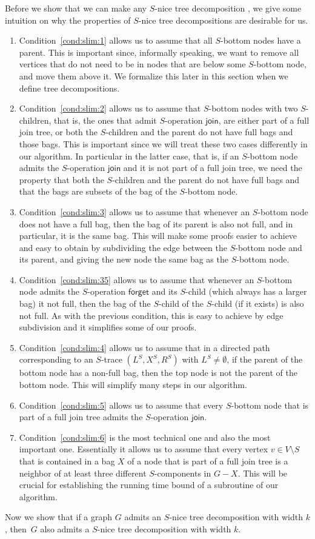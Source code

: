\documentclass[a4paper,UKenglish,cleveref, autoref, thm-restate, numberwithinsect]{lipics-v2021}
\newcounter{algorithm}
\newcommand{\forget}{\mathsf{forget}}
\newcommand{\join}{\mathsf{join}}
\newcommand{\slim}{\text{slim}\xspace}
\newcommand{\topheavy}{\text{top-heavy}\xspace}
\begin{document}
Before we show that we can make any $S$-nice tree decomposition \slim, we give some intuition on why the properties of \slim $S$-nice tree decompositions are desirable for us.
\begin{enumerate}
\item Condition~\ref{cond:slim:1} allows us to assume that all $S$-bottom nodes have a parent. This is important since, informally speaking, we want to remove all vertices that do not need to be in nodes that are below some $S$-bottom node, and move them above it. We formalize this later in this section when we define \topheavy tree decompositions.
\item Condition~\ref{cond:slim:2} allows us to assume that $S$-bottom nodes with two $S$-children, that is, the ones that admit $S$-operation $\join$, are either part of a full join tree, or both the $S$-children and the parent do not have full bags and those bags. This is important since we will treat these two cases differently in our algorithm. In particular in the latter case, that is, if an $S$-bottom node admits the $S$-operation $\join$ and it is not part of a full join tree, we need the property that both the $S$-children and the parent do not have full bags and that the bags are subsets of the bag of the $S$-bottom node.
\item Condition~\ref{cond:slim:3} allows us to assume that whenever an $S$-bottom node does not have a full bag, then the bag of its parent is also not full, and in particular, it is the same bag. This will make some proofs easier to achieve and easy to obtain by subdividing the edge between the $S$-bottom node and its parent, and giving the new node the same bag as the $S$-bottom node.
\item Condition~\ref{cond:slim:35} allows us to assume that whenever an $S$-bottom node admits the $S$-operation $\forget$ and its $S$-child (which always has a larger bag) it not full, then the bag of the $S$-child of the $S$-child (if it exists) is also not full. As with the previous condition, this is easy to achieve by edge subdivision and it simplifies some of our proofs.
\item Condition~\ref{cond:slim:4} allows us to assume that in a directed path corresponding to an $S$-trace $(L^S,X^S,R^S)$ with $L^S\neq \emptyset$, if the parent of the bottom node has a non-full bag, then the top node is not the parent of the bottom node. This will simplify many steps in our algorithm.
\item Condition~\ref{cond:slim:5} allows us to assume that every $S$-bottom node that is part of a full join tree admits the $S$-operation $\join$.
\item Condition~\ref{cond:slim:6} is the most technical one and also the most important one. Essentially it allows us to assume that every vertex $v\in V\setminus S$ that is contained in a bag $X$ of a node that is part of a full join tree is a neighbor of at least three different $S$-components in $G-X$. This will be crucial for establishing the running time bound of a subroutine of our algorithm.
\end{enumerate}
Now we show that if a graph $G$ admits an $S$-nice tree decomposition with width $k$, then~$G$ also admits a \slim $S$-nice tree decomposition with width $k$. 
\end{document}
